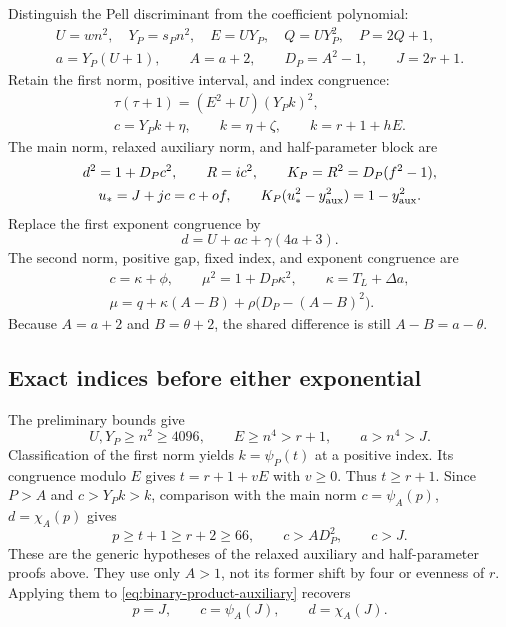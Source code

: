 Distinguish the Pell discriminant from the coefficient polynomial:
\begin{equation}\label{eq:binary-product-pell-definitions}
\begin{gathered}
 U=wn^2,\quad Y_P=s_Pn^2,\quad E=UY_P,\quad Q=UY_P^2,\quad
 P=2Q+1,\\
 a=Y_P(U+1),\qquad A=a+2,\qquad D_P=A^2-1,\qquad J=2r+1.
\end{gathered}
\end{equation}
Retain the first norm, positive interval, and index congruence:
\begin{equation}\label{eq:binary-product-first-pell}
\begin{gathered}
 \tau(\tau+1)=(E^2+U)(Y_Pk)^2,\\
 c=Y_Pk+\eta,\qquad k=\eta+\zeta,\qquad
 k=r+1+hE.
\end{gathered}
\end{equation}
The main norm, relaxed auxiliary norm, and half-parameter block are
\begin{equation}\label{eq:binary-product-auxiliary}
\begin{gathered}
 d^2=1+D_Pc^2,\qquad R=ic^2,\qquad
 K_P=R^2=D_P(f^2-1),\\
 u_*=J+jc=c+of,\qquad
 K_P(u_*^2-y_{\rm aux}^2)=1-y_{\rm aux}^2.
\end{gathered}
\end{equation}
Replace the first exponent congruence by
\begin{equation}\label{eq:binary-product-first-exponent}
 d=U+ac+\gamma(4a+3).
\end{equation}
The second norm, positive gap, fixed index, and exponent congruence are
\begin{equation}\label{eq:binary-product-second-pell}
\begin{gathered}
 c=\kappa+\phi,\qquad \mu^2=1+D_P\kappa^2,\qquad
 \kappa=T_L+\Delta a,\\
 \mu=q+\kappa(A-B)+\rho\bigl(D_P-(A-B)^2\bigr).
\end{gathered}
\end{equation}
Because $A=a+2$ and $B=\theta+2$, the shared difference is still
$A-B=a-\theta$.

\subsection{Exact indices before either exponential}

The preliminary bounds give
\[
 U,Y_P\ge n^2\ge4096,\qquad
 E\ge n^4>r+1,\qquad a>n^4>J.
\]
Classification of the first norm yields $k=\psi_P(t)$ at a positive
index. Its congruence modulo $E$ gives
$t=r+1+vE$ with $v\ge0$. Thus $t\ge r+1$. Since $P>A$ and
$c>Y_Pk>k$, comparison with the main norm
$c=\psi_A(p)$, $d=\chi_A(p)$ gives
\[
 p\ge t+1\ge r+2\ge66,\qquad c>AD_P^2,\qquad c>J.
\]
These are the generic hypotheses of the relaxed auxiliary and
half-parameter proofs above. They use only $A>1$, not its former
shift by four or evenness of $r$. Applying them to
\eqref{eq:binary-product-auxiliary} recovers
\[
 p=J,\qquad c=\psi_A(J),\qquad d=\chi_A(J).
\]

